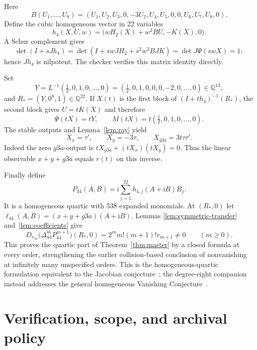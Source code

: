 \documentclass[11pt]{article}
\newcommand{\Q}{\mathbb Q}
\newcommand{\ii}{\mathrm i}
\begin{document}
Here
\begin{equation}
B(U_1,\ldots,U_8)=
(U_1,U_2,U_3,0,-3U_2,U_4,U_5,0,0,U_6,U_7,U_8,0).
\end{equation}
Define the cubic homogeneous vector in 22 variables
\begin{equation}
 h_4(X,U,w)=\bigl(wH_2(X)+w^2BU,-K(X),0\bigr).
 \label{eq:h22}
\end{equation}
A Schur complement gives
\[
 \det(I+sJh_4)
 =\det\!\left(I+s wJH_2+s^2w^2BJK\right)
 =\det J\Psi(swX)=1;
\]
hence $Jh_4$ is nilpotent.  The checker verifies this matrix identity
directly.

Set
\begin{equation}
Y=L^{-1}(\tfrac12,0,1,0,\ldots,0)
=(\tfrac12,0,1,0,0,0,-2,0,\ldots,0)\in\Q^{13},
\end{equation}
and $R_*=(Y,0^8,1)\in\Q^{22}$.  If $X(t)$ is the first block of
$(I+th_4)^{-1}(R_*)$, the second block gives $U=tK(X)$ and therefore
\[
 \Psi(tX)=tY,\qquad M(tX)=t(\tfrac12,0,1,0,\ldots,0).
\]
The stable outputs and Lemma~\ref{lem:ray} yield
\begin{equation}
 X_x=\tau',\qquad X_y=-3\tau,\qquad
 X_{g3a}=3t\tau\tau'.
 \label{eq:rcoordinates}
\end{equation}
Indeed the zero $g3a$-output is
$tX_{g3a}+(tX_x)(tX_y)=0$.  Thus the linear observable
$x+y+g3a$ equals $r(t)$ on this inverse.

Finally define
\begin{equation}
 P_{44}(A,B)=\ii\sum_{j=1}^{22}h_{4,j}(A+\ii B)B_j.
 \label{eq:P44}
\end{equation}
It is a homogeneous quartic with 538 expanded monomials.  At $(R_*,0)$ let
$\ell_{44}(A,B)=(x+y+g3a)(A+\ii B)$.  Lemmas
\ref{lem:symmetric-transfer} and~\ref{lem:coefficients} give
\begin{equation}
 D_{v_{44}}\bigl(\Delta_{44}^mP_{44}^{m+1}\bigr)(R_*,0)
 =2^m m!(m+1)!r_{m+1}\ne0
 \qquad(m\ge0).
 \label{eq:P44nonzero}
\end{equation}
This proves the quartic part of Theorem~\ref{thm:master} by a closed formula
at every order, strengthening the earlier collision-based conclusion of
nonvanishing at infinitely many unspecified orders.  This is the
homogeneous-quartic formulation equivalent to the Jacobian
conjecture~\cite{zhao-hnp}; the degree-eight companion instead addresses the
general homogeneous Vanishing Conjecture~\cite{zhao-general-vc}.

\section{Verification, scope, and archival policy}
\end{document}
